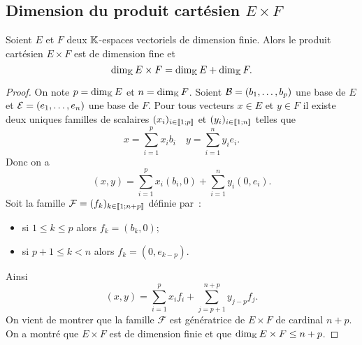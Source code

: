 \subsection{Dimension du produit cartésien $E \times F$}

\begin{theo}
  Soient $E$ et $F$ deux $\mathbb{K}$-espaces vectoriels de dimension finie. Alors le produit cartésien $E \times F$ est de dimension fine et
  \begin{equation}
    \operatorname{dim}_{\mathbb{K}} E \times F = \operatorname{dim}_{\mathbb{K}} E + \operatorname{dim}_{\mathbb{K}} F.
  \end{equation}
\end{theo}
\begin{proof}
On note $p=\operatorname{dim}_{\mathbb{K}} E$ et $n=\operatorname{dim}_{\mathbb{K}} F$. Soient $\mathcal{B}=(b_1,\ldots, b_p)$ une base de $E$ et $\mathcal{E}=(e_1, \ldots, e_n)$ une base de $F$. Pour tous vecteurs $x \in E$ et $y \in F$ il existe deux uniques familles de scalaires $(x_i)_{i \in \mathopen{\llbracket}1\mathclose{}\mathpunct{};p\mathclose{\rrbracket}}$ et $(y_i)_{i \in \mathopen{\llbracket}1\mathclose{}\mathpunct{};n\mathclose{\rrbracket}}$ telles que
    \begin{equation}
      x = \sum_{i=1}^p x_i b_i \quad y = \sum_{i=1}^n y_i e_i.
    \end{equation}
    Donc on a
    \begin{equation}
      (x,y) = \sum_{i=1}^p x_i (b_i,0) + \sum_{i=1}^n y_i (0,e_i).
    \end{equation}
Soit la famille $\mathcal{F}=(f_k)_{k \in \mathopen{\llbracket}1\mathclose{}\mathpunct{};n+p\mathclose{\rrbracket}}$ définie par~:
\begin{itemize}
\item si $1 \leq k \leq p$ alors $f_k=(b_k,0)$;
\item si $p+1 \leq k < n$ alors $f_k=(0,e_{k-p})$.
\end{itemize}
Ainsi
\begin{equation}
  (x,y)=\sum_{i=1}^p x_i f_i + \sum_{j=p+1}^{n+p} y_{j-p} f_j.
\end{equation}
On vient de montrer que la famille $\mathcal{F}$ est génératrice de $E \times F$ de cardinal $n+p$. On a montré que $E \times F$ est de dimension finie et que $\operatorname{dim}_{\mathbb{K}} E\times F \leq n+p$. 


\end{proof}
